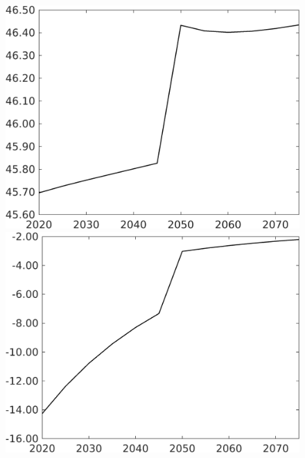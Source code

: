 \documentclass[12pt]{article}
\begin{document}
\begin{figure}[h!!]
\begin{minipage}[]{0.32\textwidth}
	\end{minipage}		
	\begin{minipage}[]{0.32\textwidth}
		\includegraphics[width=1\textwidth]{../../codding_model/own_basedOnFried/optimalPol_010922_revision/figures/all_13Sept22/CompTaufPER_bytaul_Reg0_sff_spillover0_nsk1_xgr0_knspil0_sep0_LFlimit1_emsbase0_countec0_GovRev0_etaa0.79_lgd0.png}
	\end{minipage}		
	\begin{minipage}[]{0.32\textwidth}
		\includegraphics[width=1\textwidth]{../../codding_model/own_basedOnFried/optimalPol_010922_revision/figures/all_13Sept22/CompTaufPER_bytaul_Reg0_sg_spillover0_nsk1_xgr0_knspil0_sep0_LFlimit1_emsbase0_countec0_GovRev0_etaa0.79_lgd0.png}

\end{minipage}
\end{figure}
\end{document}
